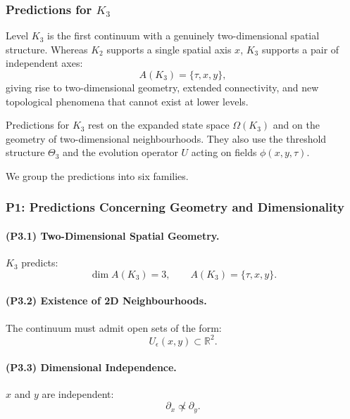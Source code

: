 

\subsubsection{Predictions for \texorpdfstring{$K_3$}{K_3}}
\label{sec:predictions-k3}

Level $K_3$ is the first continuum with a genuinely two-dimensional spatial
structure. Whereas $K_2$ supports a single spatial axis $x$, $K_3$ supports a
pair of independent axes:
\[
A(K_3) = \{\tau, x, y\},
\]
giving rise to two-dimensional geometry, extended connectivity, and new
topological phenomena that cannot exist at lower levels.

Predictions for $K_3$ rest on the expanded state space $\Omega(K_3)$
and on the geometry of two-dimensional neighbourhoods. They also use
the threshold structure $\Theta_3$ and the evolution operator $U$
acting on fields $\phi(x,y,\tau)$.

We group the predictions into six families.

\subsubsection{P1: Predictions Concerning Geometry and Dimensionality}

\paragraph{(P3.1) Two-Dimensional Spatial Geometry.}
$K_3$ predicts:
\[
\dim A(K_3) = 3,
\qquad
A(K_3) = \{\tau, x, y\}.
\]

\paragraph{(P3.2) Existence of 2D Neighbourhoods.}
The continuum must admit open sets of the form:
\[
U_\epsilon(x,y) \subset \mathbb{R}^2.
\]

\paragraph{(P3.3) Dimensional Independence.}
$x$ and $y$ are independent:
\[
\partial_x \not\propto \partial_y.
\]

